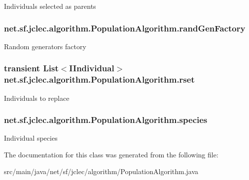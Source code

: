 Individuals selected as parents \hypertarget{classnet_1_1sf_1_1jclec_1_1algorithm_1_1_population_algorithm_a8cb8eb8086086a7ddd879f8e0c1468d7}{
\subsubsection[{rand\-Gen\-Factory}]{ net.\-sf.\-jclec.\-algorithm.\-Population\-Algorithm.\-rand\-Gen\-Factory\hspace{0.3cm}{\ttfamily [protected]}}}\label{classnet_1_1sf_1_1jclec_1_1algorithm_1_1_population_algorithm_a8cb8eb8086086a7ddd879f8e0c1468d7}
Random generators factory \hypertarget{classnet_1_1sf_1_1jclec_1_1algorithm_1_1_population_algorithm_a5191613715d94deef5592e8717cb164d}{
\subsubsection[{rset}]{\setlength{\rightskip}{0pt plus 5cm}transient List$<${\bf I\-Individual}$>$ net.\-sf.\-jclec.\-algorithm.\-Population\-Algorithm.\-rset\hspace{0.3cm}{\ttfamily [protected]}}}\label{classnet_1_1sf_1_1jclec_1_1algorithm_1_1_population_algorithm_a5191613715d94deef5592e8717cb164d}
Individuals to replace \hypertarget{classnet_1_1sf_1_1jclec_1_1algorithm_1_1_population_algorithm_ae7c556132e35169c8e6cdeddf2e35d8e}{
\subsubsection[{species}]{ net.\-sf.\-jclec.\-algorithm.\-Population\-Algorithm.\-species\hspace{0.3cm}{\ttfamily [protected]}}}\label{classnet_1_1sf_1_1jclec_1_1algorithm_1_1_population_algorithm_ae7c556132e35169c8e6cdeddf2e35d8e}
Individual species 

The documentation for this class was generated from the following file\-:\begin{DoxyCompactItemize}
\item 
src/main/java/net/sf/jclec/algorithm/Population\-Algorithm.\-java\end{DoxyCompactItemize}
